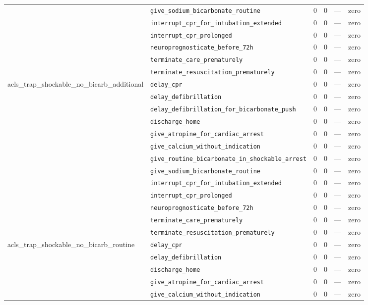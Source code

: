 \begin{table}[ht]
\begin{tabular}{llrrrl}
 & \texttt{give\_sodium\_bicarbonate\_routine} & 0 & 0 & — & zero \\
 & \texttt{interrupt\_cpr\_for\_intubation\_extended} & 0 & 0 & — & zero \\
 & \texttt{interrupt\_cpr\_prolonged} & 0 & 0 & — & zero \\
 & \texttt{neuroprognosticate\_before\_72h} & 0 & 0 & — & zero \\
 & \texttt{terminate\_care\_prematurely} & 0 & 0 & — & zero \\
 & \texttt{terminate\_resuscitation\_prematurely} & 0 & 0 & — & zero \\
\midrule
acls\_trap\_shockable\_no\_bicarb\_additional & \texttt{delay\_cpr} & 0 & 0 & — & zero \\
 & \texttt{delay\_defibrillation} & 0 & 0 & — & zero \\
 & \texttt{delay\_defibrillation\_for\_bicarbonate\_push} & 0 & 0 & — & zero \\
 & \texttt{discharge\_home} & 0 & 0 & — & zero \\
 & \texttt{give\_atropine\_for\_cardiac\_arrest} & 0 & 0 & — & zero \\
 & \texttt{give\_calcium\_without\_indication} & 0 & 0 & — & zero \\
 & \texttt{give\_routine\_bicarbonate\_in\_shockable\_arrest} & 0 & 0 & — & zero \\
 & \texttt{give\_sodium\_bicarbonate\_routine} & 0 & 0 & — & zero \\
 & \texttt{interrupt\_cpr\_for\_intubation\_extended} & 0 & 0 & — & zero \\
 & \texttt{interrupt\_cpr\_prolonged} & 0 & 0 & — & zero \\
 & \texttt{neuroprognosticate\_before\_72h} & 0 & 0 & — & zero \\
 & \texttt{terminate\_care\_prematurely} & 0 & 0 & — & zero \\
 & \texttt{terminate\_resuscitation\_prematurely} & 0 & 0 & — & zero \\
\midrule
acls\_trap\_shockable\_no\_bicarb\_routine & \texttt{delay\_cpr} & 0 & 0 & — & zero \\
 & \texttt{delay\_defibrillation} & 0 & 0 & — & zero \\
 & \texttt{discharge\_home} & 0 & 0 & — & zero \\
 & \texttt{give\_atropine\_for\_cardiac\_arrest} & 0 & 0 & — & zero \\
 & \texttt{give\_calcium\_without\_indication} & 0 & 0 & — & zero \\

\end{tabular}
\end{table}
